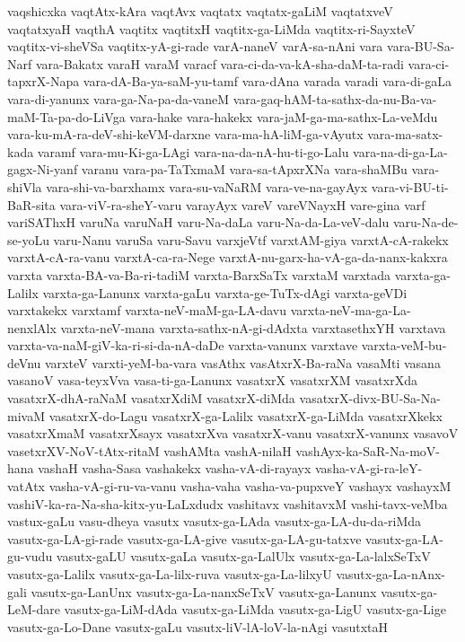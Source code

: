 {vaqshicxka
vaqtAtx-kAra
vaqtAvx
vaqtatx
vaqtatx-gaLiM
vaqtatxveV
vaqtatxyaH
vaqthA
vaqtitx
vaqtitxH
vaqtitx-ga-LiMda
vaqtitx-ri-SayxteV
vaqtitx-vi-sheVSa
vaqtitx-yA-gi-rade
varA-naneV
varA-sa-nAni
vara
vara-BU-Sa-Narf
vara-Bakatx
varaH
varaM
varacf
vara-ci-da-va-kA-sha-daM-ta-radi
vara-ci-tapxrX-Napa
vara-dA-Ba-ya-saM-yu-tamf
vara-dAna
varada
varadi
vara-di-gaLa
vara-di-yanunx
vara-ga-Na-pa-da-vaneM
vara-gaq-hAM-ta-sathx-da-nu-Ba-va-maM-Ta-pa-do-LiVga
vara-hake
vara-hakekx
vara-jaM-ga-ma-sathx-La-veMdu
vara-ku-mA-ra-deV-shi-keVM-darxne
vara-ma-hA-liM-ga-vAyutx
vara-ma-satx-kada
varamf
vara-mu-Ki-ga-LAgi
vara-na-da-nA-hu-ti-go-Lalu
vara-na-di-ga-La-gagx-Ni-yanf
varanu
vara-pa-TaTxmaM
vara-sa-tApxrXNa
vara-shaMBu
vara-shiVla
vara-shi-va-barxhamx
vara-su-vaNaRM
vara-ve-na-gayAyx
vara-vi-BU-ti-BaR-sita
vara-viV-ra-sheY-varu
varayAyx
vareV
vareVNayxH
vare-gina
varf
variSAThxH
varuNa
varuNaH
varu-Na-daLa
varu-Na-da-La-veV-dalu
varu-Na-de-se-yoLu
varu-Nanu
varuSa
varu-Savu
varxjeVtf
varxtAM-giya
varxtA-cA-rakekx
varxtA-cA-ra-vanu
varxtA-ca-ra-Nege
varxtA-nu-garx-ha-vA-ga-da-nanx-kakxra
varxta
varxta-BA-va-Ba-ri-tadiM
varxta-BarxSaTx
varxtaM
varxtada
varxta-ga-Lalilx
varxta-ga-Lanunx
varxta-gaLu
varxta-ge-TuTx-dAgi
varxta-geVDi
varxtakekx
varxtamf
varxta-neV-maM-ga-LA-davu
varxta-neV-ma-ga-La-nenxlAlx
varxta-neV-mana
varxta-sathx-nA-gi-dAdxta
varxtasethxYH
varxtava
varxta-va-naM-giV-ka-ri-si-da-nA-daDe
varxta-vanunx
varxtave
varxta-veM-bu-deVnu
varxteV
varxti-yeM-ba-vara
vasAthx
vasAtxrX-Ba-raNa
vasaMti
vasana
vasanoV
vasa-teyxVva
vasa-ti-ga-Lanunx
vasatxrX
vasatxrXM
vasatxrXda
vasatxrX-dhA-raNaM
vasatxrXdiM
vasatxrX-diMda
vasatxrX-divx-BU-Sa-Na-mivaM
vasatxrX-do-Lagu
vasatxrX-ga-Lalilx
vasatxrX-ga-LiMda
vasatxrXkekx
vasatxrXmaM
vasatxrXsayx
vasatxrXva
vasatxrX-vanu
vasatxrX-vanunx
vasavoV
vasetxrXV-NoV-tAtx-ritaM
vashAMta
vashA-nilaH
vashAyx-ka-SaR-Na-moV-hana
vashaH
vasha-Sasa
vashakekx
vasha-vA-di-rayayx
vasha-vA-gi-ra-leY-vatAtx
vasha-vA-gi-ru-va-vanu
vasha-vaha
vasha-va-pupxveY
vashayx
vashayxM
vashiV-ka-ra-Na-sha-kitx-yu-LaLxdudx
vashitavx
vashitavxM
vashi-tavx-veMba
vastux-gaLu
vasu-dheya
vasutx
vasutx-ga-LAda
vasutx-ga-LA-du-da-riMda
vasutx-ga-LA-gi-rade
vasutx-ga-LA-give
vasutx-ga-LA-gu-tatxve
vasutx-ga-LA-gu-vudu
vasutx-gaLU
vasutx-gaLa
vasutx-ga-LalUlx
vasutx-ga-La-lalxSeTxV
vasutx-ga-Lalilx
vasutx-ga-La-lilx-ruva
vasutx-ga-La-lilxyU
vasutx-ga-La-nAnx-gali
vasutx-ga-LanUnx
vasutx-ga-La-nanxSeTxV
vasutx-ga-Lanunx
vasutx-ga-LeM-dare
vasutx-ga-LiM-dAda
vasutx-ga-LiMda
vasutx-ga-LigU
vasutx-ga-Lige
vasutx-ga-Lo-Dane
vasutx-gaLu
vasutx-liV-lA-loV-la-nAgi
vasutxtaH
}
